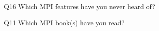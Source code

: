 \begin{description}%
\item{Q16} Which MPI features have you never heard of?%
\item{Q11} Which MPI book(s) have you read?%
\end{description}%
